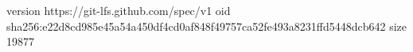 version https://git-lfs.github.com/spec/v1
oid sha256:e22d8cd985e45a54a450df4cd0af848f49757ca52fe493a8231ffd5448dcb642
size 19877
